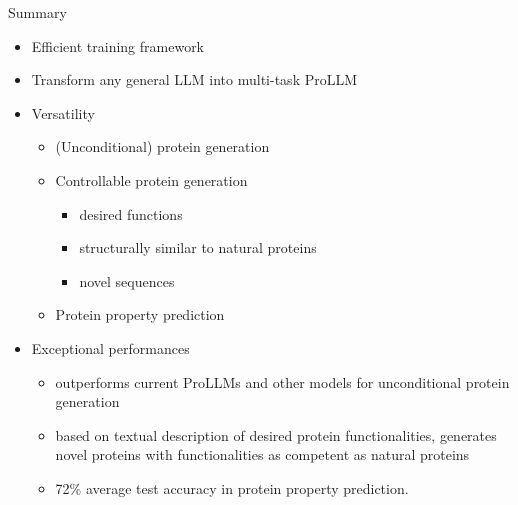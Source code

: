 \begin{frame}{Summary}
	\begin{itemize}\setlength\itemsep{1em}
			\item Efficient training framework
			\item Transform any general LLM into multi-task ProLLM
			\item Versatility
			\begin{itemize}
					\item (Unconditional) protein generation
					\item Controllable protein generation
					\begin{itemize}
							\item desired functions
							\item structurally similar to natural proteins 
							\item novel sequences
						\end{itemize}
					\item Protein property prediction
				\end{itemize}
			\item Exceptional performances
			\begin{itemize}
				\item outperforms current ProLLMs and other models for unconditional protein generation
				\item based on textual description of desired protein functionalities, generates novel proteins with functionalities as competent as natural proteins
				\item 72\% average test accuracy in protein property prediction.
			\end{itemize}
		\end{itemize}
\end{frame}